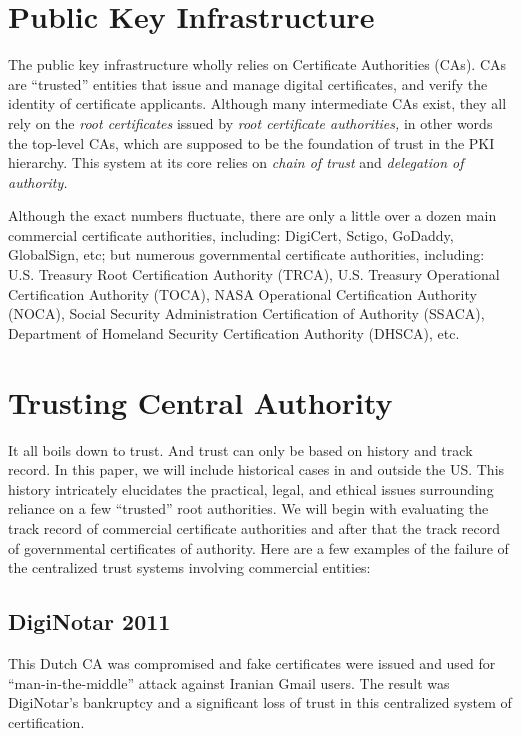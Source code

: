 \documentclass[twoside,twocolumn]{article}
\begin{document}
\section*{Public Key Infrastructure}
The public key infrastructure wholly relies on
Certificate Authorities (CAs).
CAs are ``trusted'' entities that issue and manage digital certificates, and
verify the identity of certificate applicants.\cite{whatareCA}
Although many intermediate CAs exist, they all rely on the
\textit{root certificates}
issued by 
\textit{root certificate authorities,}
in other words the top-level CAs,
which are supposed to be the foundation of trust in the PKI hierarchy.
This system at its core relies on
\textit{chain of trust}
and
\textit{delegation of authority.}

Although the exact numbers fluctuate,
there are only a little over a dozen main commercial certificate authorities, including:
DigiCert,
Sctigo,
GoDaddy,
GlobalSign, etc;
but numerous governmental certificate authorities, including:
U.S. Treasury Root Certification Authority (TRCA),
U.S. Treasury Operational Certification Authority (TOCA),
NASA Operational Certification Authority (NOCA),
Social Security Administration Certification of Authority (SSACA),
Department of Homeland Security Certification Authority (DHSCA), etc.\cite{CA}





\section*{Trusting Central Authority}
It all boils down to trust.
And trust can only be based on history and track record.
In this paper, we will include historical cases in and outside the US.
This history intricately elucidates the practical, legal, and ethical issues
surrounding reliance on a few ``trusted'' root authorities.
We will begin with evaluating 
the track record of commercial certificate authorities
and after that the track record of governmental certificates of authority.
Here are a few examples of the failure of the centralized trust systems involving commercial entities:\cite{CAfailure}

\subsection*{DigiNotar 2011}
This Dutch CA was compromised and fake certificates were issued and used for ``man-in-the-middle'' attack against Iranian Gmail users.
The result was DigiNotar's bankruptcy and a significant loss of trust in this centralized system of certification.\cite{diginotar}
\end{document}
